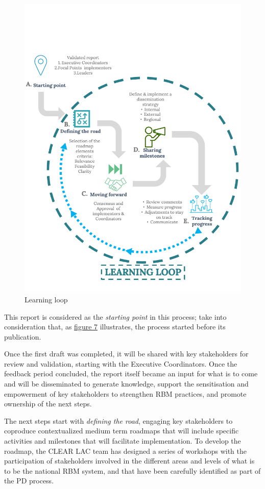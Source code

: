 \documentclass[
]{book}
\begin{document}
\begin{figure}
\includegraphics[width=1\linewidth]{./images/figure_7} \caption{Learning loop}\label{fig:figure7}
\end{figure}

This report is considered as the \emph{starting point} in this process; take into consideration that, as \protect\hyperlink{fig:figure7}{figure 7} illustrates, the process started before its publication.

Once the first draft was completed, it will be shared with key stakeholders for review and validation, starting with the Executive Coordinators. Once the feedback period concluded, the report itself became an input for what is to come and will be disseminated to generate knowledge, support the sensitisation and empowerment of key stakeholders to strengthen RBM practices, and promote ownership of the next steps.

The next steps start with \emph{defining the road}, engaging key stakeholders to coproduce contextualized medium term roadmaps that will include specific activities and milestones that will facilitate implementation. To develop the roadmap, the CLEAR LAC team has designed a series of workshops with the participation of stakeholders involved in the different areas and levels of what is to be the national RBM system, and that have been carefully identified as part of the PD process.
\end{document}
